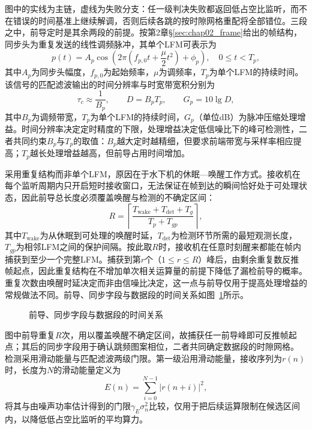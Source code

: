图中的实线为主链，虚线为失败分支：任一级判决失败都返回低占空比监听，而不在错误的时间基准上继续解调，否则后续各跳的按时隙网格重配将全部错位。三段之中，前导定时是其余两段的前提。按第2章\S\ref{sec:chap02_frame}给出的帧结构，同步头为重复发送的线性调频脉冲，其单个LFM可表示为
\begin{equation}
 p(t)=A_p\cos\left(2\pi\left(f_{p,0}t+\frac{\mu}{2}t^2\right)+\phi_p\right),
\quad 0\leq t<T_p ,
\label{eq:chap03_lfm_preamble}
\end{equation}
其中$A_p$为同步头幅度，$f_{p,0}$为起始频率，$\mu$为调频率，$T_p$为单个LFM的持续时间。该信号的匹配滤波输出的时间分辨率与时宽带宽积分别为
\begin{equation}
 \tau_c\approx\frac{1}{B_p},\qquad D=B_pT_p,\qquad G_p=10\lg D,
\label{eq:chap03_lfm_resolution}
\end{equation}
其中$B_p$为调频带宽，$T_p$为单个LFM的持续时间，$G_p$（单位dB）为脉冲压缩处理增益。时间分辨率决定定时精度的下限，处理增益决定低信噪比下的峰可检测性，二者共同约束$B_p$与$T_p$的取值：$B_p$越大定时越精细，但要求前端带宽与采样率相应提高；$T_p$越长处理增益越高，但前导占用时间增加。

采用重复结构而非单个LFM，原因在于水下机的休眠—唤醒工作方式。接收机在每个监听周期内只开启短时接收窗口，无法保证在帧到达的瞬间恰好处于可处理状态，因此前导总长度必须覆盖唤醒与检测的不确定区间：
\begin{equation}
 R=\left\lceil\frac{T_{\mathrm{wake}}+T_{\mathrm{det}}+T_g}{T_p+T_{gp}}\right\rceil,
\label{eq:chap03_repeat_count}
\end{equation}
其中$T_{\mathrm{wake}}$为从休眠到可处理的唤醒时延，$T_{\mathrm{det}}$为检测环节所需的最短观测长度，$T_{gp}$为相邻LFM之间的保护间隔。按此取$R$时，接收机在任意时刻醒来都能在帧内捕获到至少一个完整LFM。捕获到第$r$个（$1\leq r\leq R$）峰后，由剩余重复数反推帧起点，因此重复结构在不增加单次相关运算量的前提下降低了漏检前导的概率。重复次数由唤醒时延决定而非由信噪比决定，这一点与前导仅用于提高处理增益的常规做法不同。前导、同步字段与数据段的时间关系如图~\ref{fig:chap03_frame_preamble_timing}所示。

\begin{figure}[htbp]
 \centering
 \begin{tikzpicture}[x=1cm,y=1cm]
  
 \end{tikzpicture}
 \caption[前导、同步字段与数据段的时间关系]{前导、同步字段与数据段的时间关系}
 \label{fig:chap03_frame_preamble_timing}
\end{figure}

图中前导重复$R$次，用以覆盖唤醒不确定区间，故捕获任一前导峰即可反推帧起点；其后的同步字段用于确认跳频图案相位，二者共同确定数据段的时隙网格。
检测采用滑动能量与匹配滤波两级门限。第一级沿用滑动能量，接收序列为$r(n)$时，长度为$N$的滑动能量定义为
\begin{equation}
 E(n)=\sum_{i=0}^{N-1}|r(n+i)|^2 ,
\label{eq:chap03_energy}
\end{equation}
将其与由噪声功率估计得到的门限$\gamma_E\sigma_n^2$比较，仅用于把后续运算限制在候选区间内，以降低低占空比监听的平均算力。

